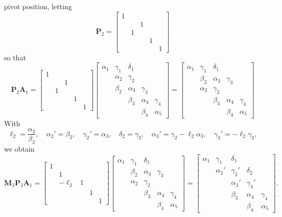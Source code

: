 pivot position, letting
\[
\boldsymbol{P}_2=\begin{bmatrix}
1& & & &\\
 & &1& &\\
 &1& & &\\
 & & &1&\\
 & & & &1
\end{bmatrix}
\]
so that
\[
\boldsymbol{P}_2\boldsymbol{A}_1
=\begin{bmatrix}
1& & & &\\
 & &1& &\\
 &1& & &\\
 & & &1&\\
 & & & &1
\end{bmatrix}
\begin{bmatrix}
\alpha_1&\gamma_1&\delta_1&        &\\
        &\alpha_2&\gamma_2&        &\\
        & \beta_2&\alpha_3&\gamma_3&\\
        &        & \beta_3&\alpha_4&\gamma_4\\
        &        &        & \beta_4&\alpha_5
\end{bmatrix}
=\begin{bmatrix}
\alpha_1&\gamma_1&\delta_1&        &\\
        & \beta_2&\alpha_3&\gamma_3&\\
        &\alpha_2&\gamma_2&        &\\
        &        & \beta_3&\alpha_4&\gamma_4\\
        &        &        & \beta_4&\alpha_5
\end{bmatrix}
\]
With
\[
\ell_2=\frac{\alpha_2}{\beta_2},\quad\alpha_2'=\beta_2,\quad
\gamma_2'=\alpha_3,\quad\delta_2=\gamma_3,\quad
\alpha_3'=\gamma_2-\ell_2\alpha_3,\quad\gamma_3'=-\ell_2\gamma_3,
\]
we obtain
\[
\boldsymbol{M}_2\boldsymbol{P}_2\boldsymbol{A}_1
=\begin{bmatrix}
1&       & & &\\
 &      1& & &\\
 &-\ell_2&1& &\\
 &       & &1&\\
 &       & & &1
\end{bmatrix}
\begin{bmatrix}
\alpha_1&\gamma_1&\delta_1&        &\\
        & \beta_2&\alpha_3&\gamma_3&\\
        &\alpha_2&\gamma_2&        &\\
        &        & \beta_3&\alpha_4&\gamma_4\\
        &        &        & \beta_4&\alpha_5
\end{bmatrix}
=\begin{bmatrix}
\alpha_1& \gamma_1& \delta_1&         &\\
        &\alpha_2'&\gamma_2'&\delta_2 &\\
        &         &\alpha_3'&\gamma_3'&\\
        &         &  \beta_3&\alpha_4 &\gamma_4\\
        &         &         & \beta_4 &\alpha_5
\end{bmatrix}.
\]
